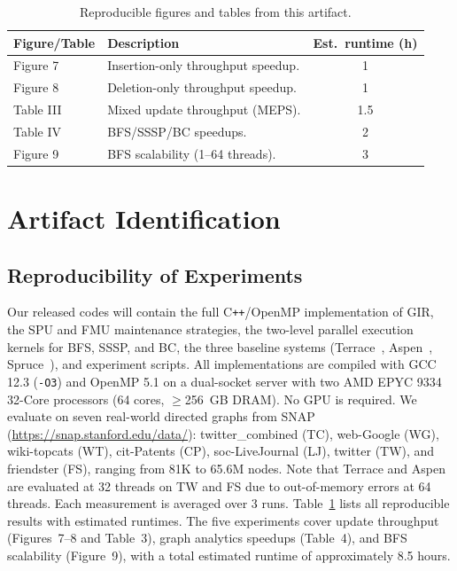 
\begin{table}[h]
\centering
\small
\setlength{\tabcolsep}{2pt}
\renewcommand{\arraystretch}{1.1}
\caption{Reproducible figures and tables from this artifact.}%
\label{tab:artifact}
\begin{tabular}{llc}
\toprule
Figure/Table & Description & Est.\ runtime (h) \\
\midrule
Figure 7 & Insertion-only throughput speedup. & 1 \\
Figure 8 & Deletion-only throughput speedup.  & 1 \\
Table III  & Mixed update throughput (MEPS).    & 1.5 \\
Table IV  & BFS/SSSP/BC speedups.              & 2 \\
Figure 9 & BFS scalability (1--64 threads).   & 3 \\
\bottomrule
\end{tabular}
\end{table}

\section*{Artifact Identification}

\subsection{Reproducibility of Experiments}





Our released codes will contain the full C\texttt{++}/OpenMP implementation of \textsc{GIR},
the SPU and FMU maintenance strategies, the two-level parallel execution
kernels for BFS, SSSP, and BC, the three baseline systems
(Terrace~\cite{pandey2021terrace}, Aspen~\cite{dhulipala2019low},
Spruce~\cite{shi2024spruce}), and experiment scripts.
All implementations are compiled with GCC 12.3 (\texttt{-O3}) and
OpenMP 5.1 on a dual-socket server with two AMD EPYC 9334 32-Core
processors (64 cores, $\geq$256~GB DRAM).
No GPU is required.
We evaluate on seven real-world directed graphs from
SNAP~\cite{snapnets} (\url{https://snap.stanford.edu/data/}):
twitter\_combined (TC), web-Google (WG), wiki-topcats (WT),
cit-Patents (CP), soc-LiveJournal (LJ), twitter (TW), and
friendster (FS), ranging from 81K to 65.6M nodes.
Note that Terrace and Aspen are evaluated at 32 threads on TW and FS
due to out-of-memory errors at 64 threads.
Each measurement is averaged over 3 runs.
Table~\ref{tab:artifact} lists all reproducible results with estimated runtimes.
The five experiments cover update throughput (Figures~7--8 and Table~3),
graph analytics speedups (Table~4), and BFS scalability (Figure~9),
with a total estimated runtime of approximately 8.5 hours.


